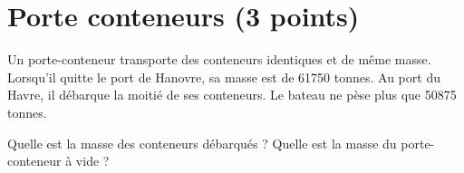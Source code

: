 \section{Porte conteneurs (3 points)}

Un porte-conteneur transporte des conteneurs identiques et de même masse.
Lorsqu'il quitte le port de Hanovre, sa masse est de \num{61750} tonnes.
Au port du Havre, il débarque la moitié de ses conteneurs. Le bateau ne pèse plus que \num{50875} tonnes.

\begin{questions}
	\question[1] Quelle est la masse des conteneurs débarqués ?
	\question[2] Quelle est la masse du porte-conteneur à vide ?
\end{questions}
